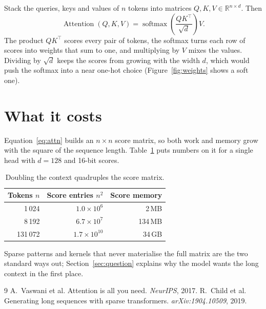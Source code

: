 \documentclass[11pt]{article}
\begin{document}
Stack the queries, keys and values of $n$ tokens into matrices $Q, K, V \in \mathbb{R}^{n \times d}$. Then
\begin{equation}\label{eq:attn}
  \operatorname{Attention}(Q,K,V) = \operatorname{softmax}\!\left(\frac{QK^{\top}}{\sqrt{d}}\right) V .
\end{equation}
The product $QK^{\top}$ scores every pair of tokens, the softmax turns each row of scores into weights that sum to one, and multiplying by $V$ mixes the values. Dividing by $\sqrt{d}$ keeps the scores from growing with the width $d$, which would push the softmax into a near one-hot choice (Figure~\ref{fig:weights} shows a soft one).

\section{What it costs}\label{sec:cost}

Equation~\eqref{eq:attn} builds an $n \times n$ score matrix, so both work and memory grow with the square of the sequence length. Table~\ref{tab:cost} puts numbers on it for a single head with $d = 128$ and 16-bit scores.

\begin{table}[ht]
\centering
\begin{tabular}{rrr}
\toprule
Tokens $n$ & Score entries $n^2$ & Score memory \\
\midrule
1\,024   & $1.0 \times 10^{6}$ & 2\,MB \\
8\,192   & $6.7 \times 10^{7}$ & 134\,MB \\
131\,072 & $1.7 \times 10^{10}$ & 34\,GB \\
\bottomrule
\end{tabular}
\caption{Doubling the context quadruples the score matrix.}
\label{tab:cost}
\end{table}

Sparse patterns \cite{child2019} and kernels that never materialise the full matrix are the two standard ways out; Section~\ref{sec:question} explains why the model wants the long context in the first place.

\begin{thebibliography}{9}
 A.~Vaswani et al. Attention is all you need. \emph{NeurIPS}, 2017.
 R.~Child et al. Generating long sequences with sparse transformers.
  \emph{arXiv:1904.10509}, 2019.
\end{thebibliography}
\end{document}
